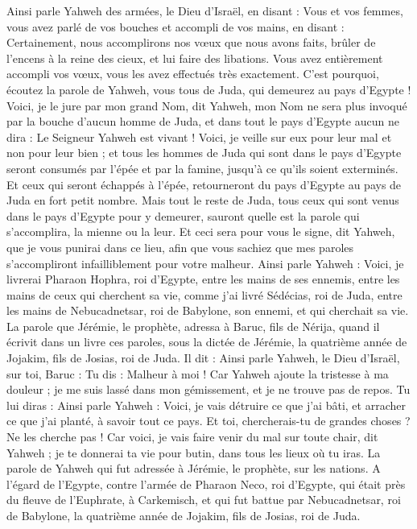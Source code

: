 \begin{multicols}{2}
Ainsi parle Yahweh des armées, le Dieu d'Israël, en disant : Vous et vos femmes, vous avez parlé de vos bouches et accompli de vos mains, en disant : Certainement, nous accomplirons nos vœux que nous avons faits, brûler de l'encens à la reine des cieux, et lui faire des libations. Vous avez entièrement accompli vos vœux, vous les avez effectués très exactement.
C'est pourquoi, écoutez la parole de Yahweh, vous tous de Juda, qui demeurez au pays d'Egypte ! Voici, je le jure par mon grand Nom, dit Yahweh, mon Nom ne sera plus invoqué par la bouche d'aucun homme de Juda, et dans tout le pays d'Egypte aucun ne dira : Le Seigneur Yahweh est vivant !
Voici, je veille sur eux pour leur mal et non pour leur bien ; et tous les hommes de Juda qui sont dans le pays d'Egypte seront consumés par l'épée et par la famine, jusqu'à ce qu'ils soient exterminés.
Et ceux qui seront échappés à l'épée, retourneront du pays d'Egypte au pays de Juda en fort petit nombre. Mais tout le reste de Juda, tous ceux qui sont venus dans le pays d'Egypte pour y demeurer, sauront quelle est la parole qui s'accomplira, la mienne ou la leur.
Et ceci sera pour vous le signe, dit Yahweh, que je vous punirai dans ce lieu, afin que vous sachiez que mes paroles s'accompliront infailliblement pour votre malheur.
Ainsi parle Yahweh : Voici, je livrerai Pharaon Hophra, roi d'Egypte, entre les mains de ses ennemis, entre les mains de ceux qui cherchent sa vie, comme j'ai livré Sédécias, roi de Juda, entre les mains de Nebucadnetsar, roi de Babylone, son ennemi, et qui cherchait sa vie.
\VerseOne{}La parole que Jérémie, le prophète, adressa à Baruc, fils de Nérija, quand il écrivit dans un livre ces paroles, sous la dictée de Jérémie, la quatrième année de Jojakim, fils de Josias, roi de Juda. Il dit :
Ainsi parle Yahweh, le Dieu d'Israël, sur toi, Baruc :
Tu dis : Malheur à moi ! Car Yahweh ajoute la tristesse à ma douleur ; je me suis lassé dans mon gémissement, et je ne trouve pas de repos.
Tu lui diras : Ainsi parle Yahweh : Voici, je vais détruire ce que j'ai bâti, et arracher ce que j'ai planté, à savoir tout ce pays.
Et toi, chercherais-tu de grandes choses ? Ne les cherche pas ! Car voici, je vais faire venir du mal sur toute chair, dit Yahweh ; je te donnerai ta vie pour butin, dans tous les lieux où tu iras.
\VerseOne{}La parole de Yahweh qui fut adressée à Jérémie, le prophète, sur les nations.
A l'égard de l'Egypte, contre l'armée de Pharaon Neco, roi d'Egypte, qui était près du fleuve de l'Euphrate, à Carkemisch, et qui fut battue par Nebucadnetsar, roi de Babylone, la quatrième année de Jojakim, fils de Josias, roi de Juda.

\end{multicols}
